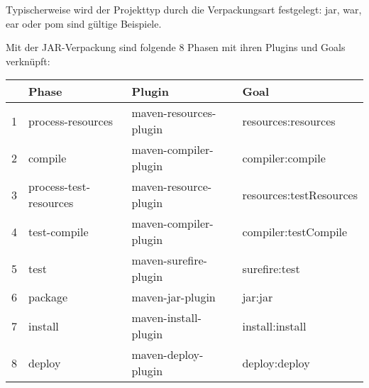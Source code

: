 Typischerweise wird der Projekttyp durch die Verpackungsart
festgelegt: jar, war, ear oder pom sind gültige Beispiele.

\newslide
Mit der JAR-Verpackung sind
folgende 8 Phasen mit ihren Plugins und Goals verknüpft:

\begin{tabularx}{\linewidth}{llll}
  & Phase &  Plugin & Goal\\
\hline
1 & process-resources & maven-resources-plugin & resources:resources\\
2 & compile & maven-compiler-plugin & compiler:compile\\
3 & process-test-resources & maven-resource-plugin & resources:testResources\\
4 & test-compile & maven-compiler-plugin & compiler:testCompile\\
5 & test & maven-surefire-plugin  & surefire:test\\
6 & package & maven-jar-plugin & jar:jar\\
7 & install & maven-install-plugin & install:install\\
8 & deploy & maven-deploy-plugin & deploy:deploy\\
\end{tabularx}
%
\newslide
